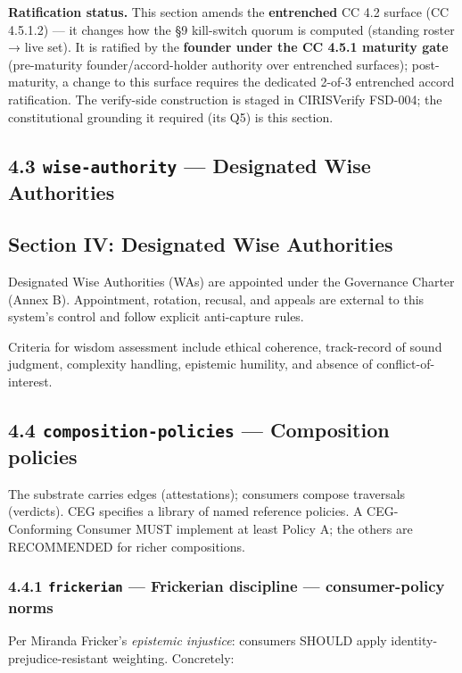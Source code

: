 \documentclass[11pt]{article}
\begin{document}
\textbf{Ratification status.} This section amends the \textbf{entrenched} CC 4.2 surface (CC 4.5.1.2) — it changes how the §9 kill-switch quorum is computed (standing roster → live set). It is ratified by the \textbf{founder under the CC 4.5.1 maturity gate} (pre-maturity founder/accord-holder authority over entrenched surfaces); post-maturity, a change to this surface requires the dedicated 2-of-3 entrenched accord ratification. The verify-side construction is staged in CIRISVerify FSD-004; the constitutional grounding it required (its Q5) is this section.


\subsection*{4.3 \texttt{wise-authority} — Designated Wise Authorities}


\subsection*{Section IV: Designated Wise Authorities}


Designated Wise Authorities (WAs) are appointed under the Governance Charter (Annex B). Appointment, rotation, recusal, and appeals are external to this system's control and follow explicit anti-capture rules.


Criteria for wisdom assessment include ethical coherence, track-record of sound judgment, complexity handling, epistemic humility, and absence of conflict-of-interest.


\subsection*{4.4 \texttt{composition-policies} — Composition policies}


The substrate carries edges (attestations); consumers compose traversals (verdicts). CEG specifies a library of named reference policies. A CEG-Conforming Consumer MUST implement at least Policy A; the others are RECOMMENDED for richer compositions.


\subsubsection*{4.4.1 \texttt{frickerian} — Frickerian discipline — consumer-policy norms}


Per Miranda Fricker's \textit{epistemic injustice}: consumers SHOULD apply identity-prejudice-resistant weighting. Concretely:
\end{document}
